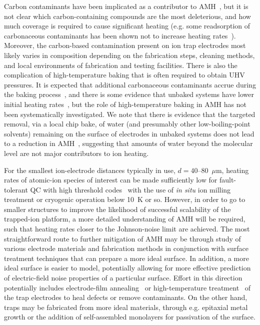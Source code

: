 \documentclass[%
12pt,
 amsmath,amssymb,
]{revtex4-2}
\begin{document}
Carbon contaminants have been implicated as a contributor to AMH~\cite{PhysRevA.95.033407_2017}, but it is not clear which carbon-containing compounds are the most deleterious, and how much coverage is required to cause significant heating (e.g. some readsorption of carbonaceous contaminants has been shown not to increase heating rates~\cite{PhysRevB.89.245435_2014}).  Moreover, the carbon-based contamination present on ion trap electrodes most likely varies in composition depending on the fabrication steps, cleaning methods, and local environments of fabrication and testing facilities.  There is also the complication of high-temperature baking that is often required to obtain UHV pressures.  It is expected that additional carbonaceous contaminants accrue during the baking process~\cite{hite_colombe_wilson_allcock_leibfried_wineland_pappas_2013,PhysRevB.89.245435_2014}, and there is some evidence that unbaked systems have lower initial heating rates~\cite{PhysRevA.89.012318_2014,PhysRevA.91.041402_2015}, but the role of high-temperature baking in AMH has not been systematically investigated.  We note that there is evidence that the targeted removal, via a local chip bake, of water (and presumably other low-boiling-point solvents) remaining on the surface of electrodes in unbaked systems does not lead to a reduction in AMH~\cite{PhysRevA.91.041402_2015}, suggesting that amounts of water beyond the molecular level are not major contributors to ion heating.

For the smallest ion-electrode distances typically in use, $d=40$--$80$~$\mu$m, heating rates of atomic-ion species of interest can be made sufficiently low for fault-tolerant QC with high threshold codes~\cite{PhysRevA.80.052312_2009} with the use of \textit{in situ} ion milling treatment or cryogenic operation below 10~K or so.  However, in order to go to smaller structures to improve the likelihood of successful scalability of the trapped-ion platform, a more detailed understanding of AMH will be required, such that heating rates closer to the Johnson-noise limit are achieved.  The most straightforward route to further mitigation of AMH may be through study of various electrode materials and fabrication methods in conjunction with surface treatment techniques that can prepare a more ideal surface.  In addition, a more ideal surface is easier to model, potentially allowing for more effective prediction of electric-field noise properties of a particular surface.  Effort in this direction potentially includes electrode-film annealing~\cite{PhysRevLett.100.013001_2008_1} or high-temperature treatment~\cite{UCB_heater_heating_rates_2018} of the trap electrodes to heal defects or remove contaminants.  On the other hand, traps may be fabricated from more ideal materials, through e.g. epitaxial metal growth or the addition of self-assembled monolayers for passivation of the surface.
\end{document}

